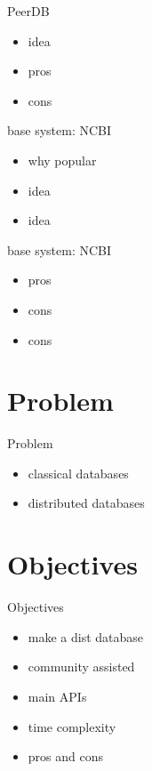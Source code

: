 \documentclass{beamer}
\begin{document}
\begin{frame}{PeerDB}
  \begin{itemize}   
    \item idea
    \item pros
    \item cons
  \end{itemize}
\end{frame}

\begin{frame}{base system: NCBI}
  \begin{itemize}   
    \item why popular
    \item idea
    \item idea
  \end{itemize}
\end{frame}

\begin{frame}{base system: NCBI}
  \begin{itemize}   
    \item pros
    \item cons
    \item cons
  \end{itemize}
\end{frame}

\section{Problem}
\begin{frame}{Problem}
  \begin{itemize}   
    \item classical databases
    \item distributed databases
  \end{itemize}
\end{frame}

\section{Objectives}
\begin{frame}{Objectives}
  \begin{itemize}   
    \item make a dist database
    \item community assisted
    \item main APIs
    \item time complexity
    \item pros and cons
  \end{itemize}
\end{frame}
\end{document}
